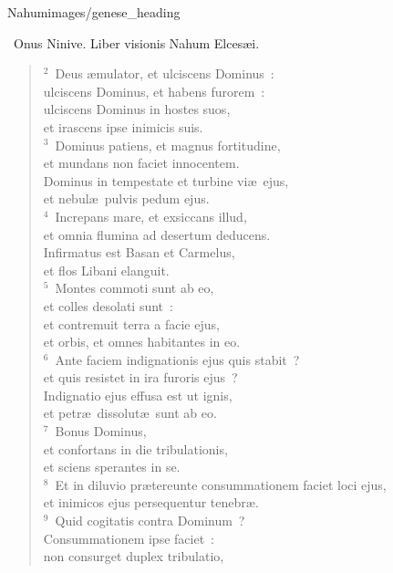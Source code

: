 {Nahum}{images/genese_heading}

~\lettrine[lines=10,image=true,loversize=0.05,lraise=-0.03]{O}{}nus Ninive. Liber visionis Nahum Elces\ae i.


\begin{flushleft}\begin{verse}\vspace{6pt}${}^{2}$~Deus \ae mulator, et ulciscens Dominus~:\\ ulciscens Dominus, et habens furorem~:\\ ulciscens Dominus in hostes suos,\\ et irascens ipse inimicis suis.\\
${}^{3}$~Dominus patiens, et magnus fortitudine,\\ et mundans non faciet innocentem.\\ Dominus in tempestate et turbine vi\ae\ ejus,\\ et nebul\ae\ pulvis pedum ejus.\\
${}^{4}$~Increpans mare, et exsiccans illud,\\ et omnia flumina ad desertum deducens.\\ Infirmatus est Basan et Carmelus,\\ et flos Libani elanguit.\\
${}^{5}$~Montes commoti sunt ab eo,\\ et colles desolati sunt~:\\ et contremuit terra a facie ejus,\\ et orbis, et omnes habitantes in eo.\\
${}^{6}$~Ante faciem indignationis ejus quis stabit~?\\ et quis resistet in ira furoris ejus~?\\ Indignatio ejus effusa est ut ignis,\\ et petr\ae\ dissolut\ae\ sunt ab eo.\\
${}^{7}$~Bonus Dominus,\\ et confortans in die tribulationis,\\ et sciens sperantes in se.\\
${}^{8}$~Et in diluvio pr\ae tereunte consummationem faciet loci ejus,\\ et inimicos ejus persequentur tenebr\ae .\\
${}^{9}$~Quid cogitatis contra Dominum~?\\ Consummationem ipse faciet~:\\ non consurget duplex tribulatio,\\

\end{verse}
\end{flushleft}
